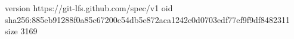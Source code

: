 version https://git-lfs.github.com/spec/v1
oid sha256:885eb91288f0a85c67200c54db5e872aca1242c0d0703edf77ef9f9df8482311
size 3169
